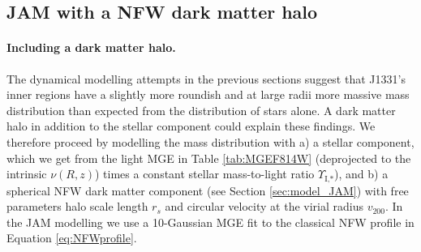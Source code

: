 \subsection{JAM with a NFW dark matter halo} \label{sec:results_JAM_NFW}

\paragraph{Including a dark matter halo.} The dynamical modelling attempts in the previous sections suggest that J1331's inner regions have a slightly more roundish and at large radii more massive mass distribution than expected from the distribution of stars alone. A dark matter halo in addition to the stellar component could explain these findings. We therefore proceed by modelling the mass distribution with a) a stellar component, which we get from the light MGE in Table \ref{tab:MGEF814W} (deprojected to the intrinsic $\nu(R,z)$) times a constant stellar mass-to-light ratio $\Upsilon_\text{I,*}$), and b) a spherical NFW dark matter component (see Section \ref{sec:model_JAM}) with free parameters halo scale length $r_s$ and circular velocity at the virial radius $v_{200}$. In the JAM modelling we use a 10-Gaussian MGE fit to the classical NFW profile in Equation \ref{eq:NFWprofile}.


